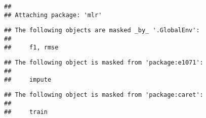 \documentclass[
]{article}
\begin{document}
\begin{verbatim}
## 
## Attaching package: 'mlr'
\end{verbatim}

\begin{verbatim}
## The following objects are masked _by_ '.GlobalEnv':
## 
##     f1, rmse
\end{verbatim}

\begin{verbatim}
## The following object is masked from 'package:e1071':
## 
##     impute
\end{verbatim}

\begin{verbatim}
## The following object is masked from 'package:caret':
## 
##     train
\end{verbatim}
\end{document}
